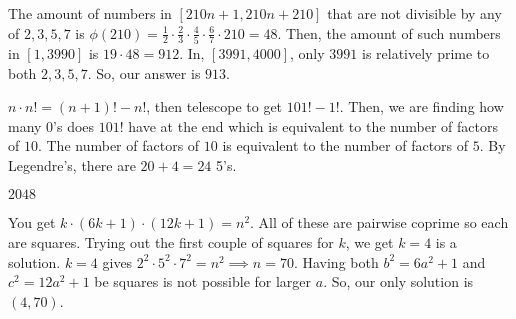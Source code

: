 \documentclass[11pt]{article}
\begin{document}

\begin{sol}
The amount of numbers in $[210n+1, 210n+210]$ that are not divisible by any of $2,3,5,7$ is $\phi(210)=\frac{1}{2}\cdot \frac{2}{3}\cdot \frac{4}{5}\cdot \frac{6}{7}\cdot 210= 48$. Then, the amount of such numbers in $[1,3990]$ is $19\cdot 48= 912$.  In, $[3991, 4000]$, only $3991$ is relatively prime to both $2,3,5,7$. So, our answer is $\boxed{913}$.
\end{sol}


\begin{sol}
$n\cdot n! = (n+1)!-n!$, then telescope to get $101!-1!$. Then, we are finding how many $0$'s does $101!$ have at the end which is equivalent to the number of factors of $10$. The number of factors of $10$ is equivalent to the number of factors of $5$. By Legendre's, there are $20+4=\boxed{24}$ 5's.
\end{sol}



\begin{sol}
$\boxed{2048}$
\end{sol}

\begin{sol}
You get $k\cdot (6k+1)\cdot (12k+1)=n^2$. All of these are pairwise coprime so each are squares. Trying out the first couple of squares for $k$, we get $k=4$ is a solution. $k=4$ gives $2^2\cdot 5^2\cdot 7^2=n^2\implies n = 70$. Having both $b^2=6a^2+1$ and $c^2=12a^2+1$ be squares is not possible for larger $a$. So, our only solution is $\boxed{(4,70)}$.
\end{sol}
 
\end{document}
